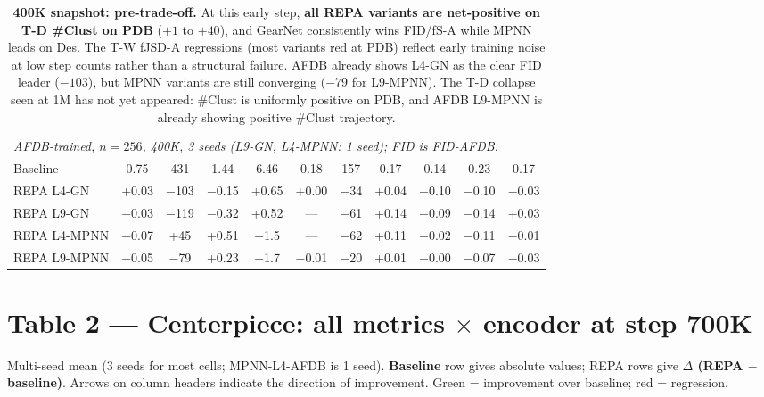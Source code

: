 \documentclass[11pt,a4paper]{article}
\newcommand{\gd}[1]{\cellcolor{green!20}#1}
\newcommand{\rd}[1]{\cellcolor{red!15}#1}
\begin{document}
\begin{table}[H]
{\begin{tabular}{l|cc|ccc|cc|c|cc}
\midrule
\multicolumn{11}{l}{\textit{AFDB-trained, $n{=}256$, 400K, 3 seeds (L9-GN, L4-MPNN: 1 seed); FID is FID-AFDB.}}\\
Baseline       & 0.75 & 431 & 1.44 & 6.46 & 0.18 & 157  & 0.17 & 0.14 & 0.23 & 0.17 \\
REPA L4-GN     & \gd{+0.03} & \gd{$-$103} & \gd{$-$0.15} & \gd{+0.65} & +0.00 & \rd{$-$34} & \rd{+0.04} & \gd{$-$0.10} & \gd{$-$0.10} & \rd{$-$0.03} \\
REPA L9-GN     & \rd{$-$0.03} & \gd{$-$119} & \gd{$-$0.32} & \gd{+0.52} & ---   & \rd{$-$61} & \rd{+0.14} & \gd{$-$0.09} & \gd{$-$0.14} & \gd{+0.03} \\
REPA L4-MPNN   & \rd{$-$0.07} & \rd{+45}  & \rd{+0.51} & \rd{$-$1.5}  & ---   & \rd{$-$62} & \rd{+0.11} & \gd{$-$0.02} & \gd{$-$0.11} & \rd{$-$0.01} \\
REPA L9-MPNN   & \rd{$-$0.05} & \gd{$-$79}  & \rd{+0.23} & \rd{$-$1.7}  & \gd{$-$0.01} & \rd{$-$20} & \rd{+0.01} & $-$0.00 & \gd{$-$0.07} & \rd{$-$0.03} \\
\bottomrule
\end{tabular}}
\caption{\textbf{400K snapshot: pre-trade-off.} At this early step, \textbf{all
REPA variants are net-positive on T-D \#Clust on PDB} ($+1$ to $+40$),
and GearNet consistently wins FID/fS-A while MPNN leads on Des.  The T-W
fJSD-A regressions (most variants red at PDB) reflect early training noise
at low step counts rather than a structural failure. AFDB already shows
L4-GN as the clear FID leader ($-103$), but MPNN variants are still
converging ($-79$ for L9-MPNN). The T-D collapse seen at 1M has not yet
appeared: \#Clust is uniformly positive on PDB, and AFDB L9-MPNN is
already showing positive \#Clust trajectory.}
\end{table}

\section{Table 2 --- Centerpiece: all metrics $\times$ encoder at step 700K}

Multi-seed mean (3 seeds for most cells; MPNN-L4-AFDB is 1 seed).
\textbf{Baseline} row gives absolute values; REPA rows give
\textbf{$\Delta$ (REPA $-$ baseline)}. Arrows on column headers indicate the
direction of improvement. \colorbox{green!20}{Green} = improvement over baseline; \colorbox{red!15}{red} = regression.
\end{document}
